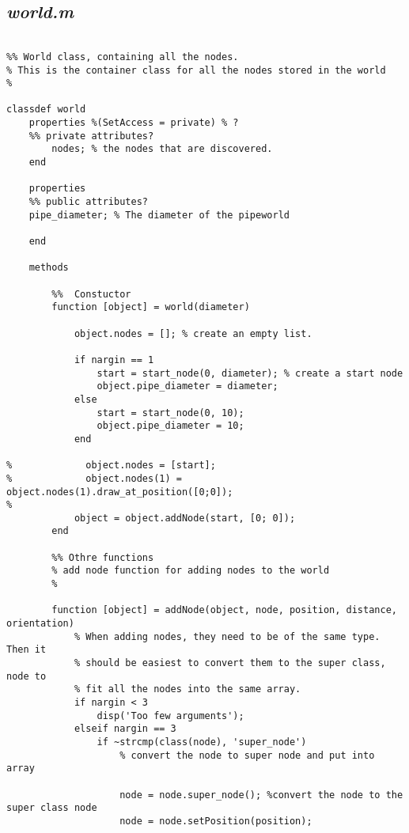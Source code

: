\subsection{\emph{world.m}}
\begin{lstlisting}

%% World class, containing all the nodes. 
% This is the container class for all the nodes stored in the world
% 

classdef world
    properties %(SetAccess = private) % ?
    %% private attributes?
        nodes; % the nodes that are discovered. 
    end
    
    properties
    %% public attributes?
    pipe_diameter; % The diameter of the pipeworld
    
    end
    
    methods
 
        %%  Constuctor
        function [object] = world(diameter)
            
            object.nodes = []; % create an empty list.
            
            if nargin == 1
                start = start_node(0, diameter); % create a start node
                object.pipe_diameter = diameter;
            else
                start = start_node(0, 10);
                object.pipe_diameter = 10;
            end
            
%             object.nodes = [start];
%             object.nodes(1) = object.nodes(1).draw_at_position([0;0]);
%                                     
            object = object.addNode(start, [0; 0]);
        end
        
        %% Othre functions
        % add node function for adding nodes to the world
        % 
        
        function [object] = addNode(object, node, position, distance, orientation)        
            % When adding nodes, they need to be of the same type. Then it
            % should be easiest to convert them to the super class, node to
            % fit all the nodes into the same array.
            if nargin < 3
                disp('Too few arguments');
            elseif nargin == 3
                if ~strcmp(class(node), 'super_node')
                    % convert the node to super node and put into array
                    
                    node = node.super_node(); %convert the node to the super class node
                    node = node.setPosition(position);
                    

\end{lstlisting}
